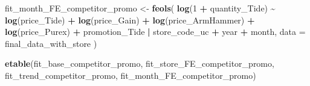 \documentclass[
]{article}
\newenvironment{Shaded}{\begin{snugshade}}{\end{snugshade}}
\newcommand{\AttributeTok}[1]{\textcolor[rgb]{0.13,0.29,0.53}{#1}}
\newcommand{\DecValTok}[1]{\textcolor[rgb]{0.00,0.00,0.81}{#1}}
\newcommand{\FunctionTok}[1]{\textcolor[rgb]{0.13,0.29,0.53}{\textbf{#1}}}
\newcommand{\NormalTok}[1]{#1}
\newcommand{\OtherTok}[1]{\textcolor[rgb]{0.56,0.35,0.01}{#1}}
\newcommand{\SpecialCharTok}[1]{\textcolor[rgb]{0.81,0.36,0.00}{\textbf{#1}}}
\begin{document}
\begin{Shaded}
\begin{Highlighting}[]
\NormalTok{fit\_month\_FE\_competitor\_promo }\OtherTok{\textless{}{-}} \FunctionTok{feols}\NormalTok{(}
  \FunctionTok{log}\NormalTok{(}\DecValTok{1} \SpecialCharTok{+}\NormalTok{ quantity\_Tide) }\SpecialCharTok{\textasciitilde{}} \FunctionTok{log}\NormalTok{(price\_Tide) }\SpecialCharTok{+} \FunctionTok{log}\NormalTok{(price\_Gain) }\SpecialCharTok{+} 
    \FunctionTok{log}\NormalTok{(price\_ArmHammer) }\SpecialCharTok{+} \FunctionTok{log}\NormalTok{(price\_Purex) }\SpecialCharTok{+} 
\NormalTok{    promotion\_Tide }\SpecialCharTok{|}\NormalTok{ store\_code\_uc }\SpecialCharTok{+}\NormalTok{ year }\SpecialCharTok{+}\NormalTok{ month,}
  \AttributeTok{data =}\NormalTok{ final\_data\_with\_store}
\NormalTok{)}

\FunctionTok{etable}\NormalTok{(fit\_base\_competitor\_promo, fit\_store\_FE\_competitor\_promo, }
\NormalTok{       fit\_trend\_competitor\_promo, fit\_month\_FE\_competitor\_promo)}
\end{Highlighting}
\end{Shaded}
\end{document}

